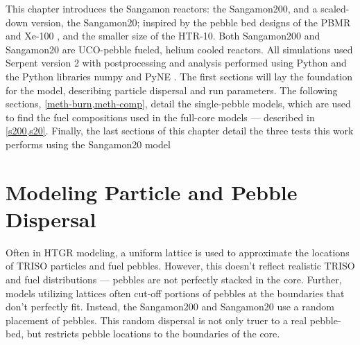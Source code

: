 This chapter introduces the Sangamon reactors:  the Sangamon200, and a scaled-down version, the Sangamon20; inspired by the pebble bed designs of the PBMR \cite{venter_pbmr_2005, noauthor_pebble_2017} and Xe-100 \cite{harlan_ans_2017, harlan_x-energy_2018}, and the smaller size of the HTR-10.  Both Sangamon200 and Sangamon20 are UCO-pebble fueled, helium cooled reactors.  All simulations used Serpent version 2 \cite{leppanenjaakko_serpent_2015} with postprocessing and analysis performed using Python \cite{van_rossum_python_nodate} and the Python libraries numpy \cite{harris_array_2020} and PyNE \cite{scopatz_pyne:_2012}.  The first sections will lay the foundation for the model, describing particle dispersal and run parameters.  The following sections, \autoref{meth-burn,meth-comp}, detail the single-pebble models, which are used to find the fuel compositions used in the full-core models --- described in \autoref{s200,s20}.  Finally, the last sections of this chapter detail the three tests this work performs using the Sangamon20 model

\section{Modeling Particle and Pebble Dispersal}

Often in HTGR modeling, a uniform lattice is used to approximate the locations of TRISO particles and fuel pebbles.  However, this doesn't reflect realistic TRISO and fuel distributions --- pebbles are not perfectly stacked in the core.  Further, models utilizing lattices often cut-off portions of pebbles at the boundaries that don't perfectly fit.  Instead, the Sangamon200 and Sangamon20 use a random placement of pebbles.  This random dispersal is not only truer to a real pebble-bed, but restricts pebble locations to the boundaries of the core.

